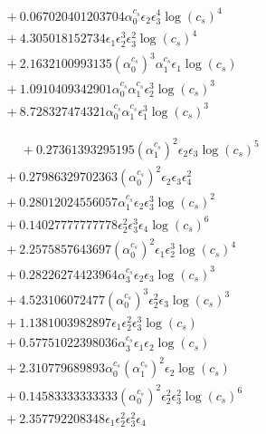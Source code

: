 \documentclass[10pt]{article}
\begin{document}
\begin{align*}
&{}  + 0.067020401203704 \alpha_{0}^{c_s} \epsilon_{2} \epsilon_{3}^{4} \log{\left(c_{s} \right)}^{4} \\
&{}  + 4.305018152734 \epsilon_{1} \epsilon_{2}^{3} \epsilon_{3}^{2} \log{\left(c_{s} \right)}^{4} \\
&{}  + 2.1632100993135 \left(\alpha_{0}^{c_s}\right)^{3} \alpha_{1}^{c_s} \epsilon_{1} \log{\left(c_{s} \right)} \\
&{}  + 1.0910409342901 \alpha_{0}^{c_s} \alpha_{1}^{c_s} \epsilon_{2}^{3} \log{\left(c_{s} \right)}^{3} \\
&{}  + 8.728327474321 \alpha_{0}^{c_s} \alpha_{1}^{c_s} \epsilon_{1}^{3} \log{\left(c_{s} \right)}^{3}
\end{align*}

\begin{align*}
\phantom{F_{s,6}} &\phantom{={}}{}  + 0.27361393295195 \left(\alpha_{1}^{c_s}\right)^{2} \epsilon_{2} \epsilon_{3} \log{\left(c_{s} \right)}^{5} \\
&{}  + 0.27986329702363 \left(\alpha_{0}^{c_s}\right)^{2} \epsilon_{2} \epsilon_{3} \epsilon_{4}^{2} \\
&{}  + 0.28012024556057 \alpha_{1}^{c_s} \epsilon_{2} \epsilon_{3}^{3} \log{\left(c_{s} \right)}^{2} \\
&{}  + 0.14027777777778 \epsilon_{2}^{2} \epsilon_{3}^{3} \epsilon_{4} \log{\left(c_{s} \right)}^{6} \\
&{}  + 2.2575857643697 \left(\alpha_{0}^{c_s}\right)^{2} \epsilon_{1} \epsilon_{2}^{3} \log{\left(c_{s} \right)}^{4} \\
&{}  + 0.28226274423964 \alpha_{3}^{c_s} \epsilon_{2} \epsilon_{3} \log{\left(c_{s} \right)}^{3} \\
&{}  + 4.523106072477 \left(\alpha_{0}^{c_s}\right)^{3} \epsilon_{2}^{2} \epsilon_{3} \log{\left(c_{s} \right)}^{3} \\
&{}  + 1.1381003982897 \epsilon_{1} \epsilon_{2}^{2} \epsilon_{3}^{3} \log{\left(c_{s} \right)} \\
&{}  + 0.57751022398036 \alpha_{3}^{c_s} \epsilon_{1} \epsilon_{2} \log{\left(c_{s} \right)} \\
&{}  + 2.310779689893 \alpha_{0}^{c_s} \left(\alpha_{1}^{c_s}\right)^{2} \epsilon_{2} \log{\left(c_{s} \right)} \\
&{}  + 0.14583333333333 \left(\alpha_{0}^{c_s}\right)^{2} \epsilon_{2}^{2} \epsilon_{3}^{2} \log{\left(c_{s} \right)}^{6} \\
&{}  + 2.357792208348 \epsilon_{1} \epsilon_{2}^{2} \epsilon_{3}^{2} \epsilon_{4} \\

\end{align*}
\end{document}
